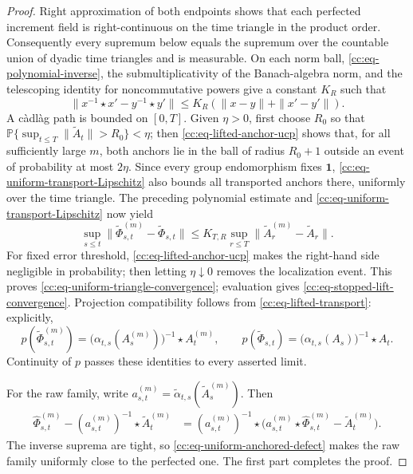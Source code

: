 \documentclass[10pt,reqno]{amsart}
\theoremstyle{plain}
\theoremstyle{definition}
\theoremstyle{remark}
\begin{document}
\begin{proof}
Right approximation of both endpoints shows that each perfected increment
field is right-continuous on the time triangle in the product order.
Consequently every supremum below equals the supremum over the countable
union of dyadic time triangles and is measurable.
On each norm ball, \eqref{cc:eq-polynomial-inverse}, the
submultiplicativity of the Banach-algebra norm, and the telescoping identity
for noncommutative powers give a constant \(K_R\) such that
\[
 \|x^{-1}\star x'-y^{-1}\star y'\|
 \le K_R(\|x-y\|+\|x'-y'\|).
\]
A càdlàg path is bounded on \([0,T]\).  Given \(\eta>0\), first choose
\(R_0\) so that
\({\mathbb P}\{\sup_{t\le T}\|\widetilde A_t\|>R_0\}<\eta\); then
\eqref{cc:eq-lifted-anchor-ucp} shows that, for all sufficiently large
\(m\), both anchors lie in the ball of radius \(R_0+1\) outside an event of
probability at most \(2\eta\).  Since every group endomorphism fixes
\({\mathbf 1}\), \eqref{cc:eq-uniform-transport-Lipschitz} also bounds all
transported anchors there, uniformly over the time triangle.  The preceding
polynomial estimate and \eqref{cc:eq-uniform-transport-Lipschitz} now
yield
\[
 \sup_{s\le t}
 \|\widetilde\Phi^{(m)}_{s,t}-\widetilde\Phi_{s,t}\|
 \le K_{T,R}\sup_{r\le T}
 \|\widetilde A^{(m)}_r-\widetilde A_r\|.
\]
For fixed error threshold, \eqref{cc:eq-lifted-anchor-ucp} makes the
right-hand side negligible in probability; then letting \(\eta\downarrow0\)
removes the localization event.  This proves
\eqref{cc:eq-uniform-triangle-convergence}; evaluation gives
\eqref{cc:eq-stopped-lift-convergence}.  Projection compatibility follows
from \eqref{cc:eq-lifted-transport}: explicitly,
\[
 p(\widetilde\Phi^{(m)}_{s,t})
 =\bigl(\alpha_{t,s}(A^{(m)}_s)\bigr)^{-1}\star A^{(m)}_t,
 \qquad
 p(\widetilde\Phi_{s,t})
 =\bigl(\alpha_{t,s}(A_s)\bigr)^{-1}\star A_t.
\]
Continuity of \(p\) passes these identities to every asserted limit.

For the raw family, write
\(a^{(m)}_{s,t}=\widetilde\alpha_{t,s}(\widetilde A^{(m)}_s)\).  Then
\begin{align*}
 \widehat\Phi^{(m)}_{s,t}
 -(a^{(m)}_{s,t})^{-1}\star\widetilde A^{(m)}_t
 &=(a^{(m)}_{s,t})^{-1}\star\bigl(
   a^{(m)}_{s,t}\star\widehat\Phi^{(m)}_{s,t}
   -\widetilde A^{(m)}_t\bigr).
\end{align*}
The inverse suprema are tight, so
\eqref{cc:eq-uniform-anchored-defect} makes the raw family uniformly
close to the perfected one.  The first part completes the proof.
\end{proof}
\end{document}
